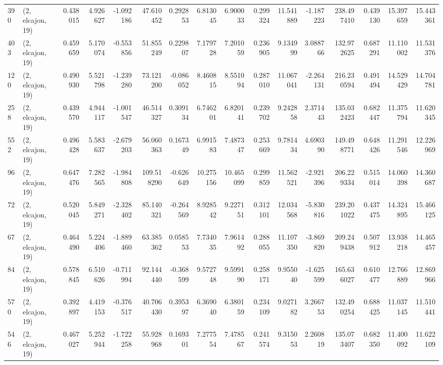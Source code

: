 \begin{tabular}{llrrrrrrrrrrrrrr}
390 &  (2, elcajon, 19) &   0.438015 &   4.926627 &  -1.092186 &    47.610452 &   0.292853 &   6.813045 &   6.900033 &  0.299324 &  11.541889 &  -1.187223 &   238.497410 &  0.439130 &  15.397659 &  15.443361 \\
403 &  (2, elcajon, 19) &   0.459659 &   5.170074 &  -0.553856 &    51.855249 &   0.229807 &   7.179728 &   7.201059 &  0.236905 &   9.134999 &   3.088766 &   132.972625 &  0.687291 &  11.110002 &  11.531376 \\
120 &  (2, elcajon, 19) &   0.490930 &   5.521798 &  -1.239280 &    73.121200 &  -0.086052 &   8.460815 &   8.551094 &  0.287010 &  11.067041 &  -2.264131 &   216.230594 &  0.491494 &  14.529429 &  14.704781 \\
258 &  (2, elcajon, 19) &   0.439570 &   4.944117 &  -1.001547 &    46.514327 &   0.309134 &   6.746201 &   6.820141 &  0.239702 &   9.242858 &   2.371443 &   135.032423 &  0.682447 &  11.375794 &  11.620345 \\
552 &  (2, elcajon, 19) &   0.496428 &   5.583637 &  -2.679203 &    56.060363 &   0.167349 &   6.991583 &   7.487347 &  0.253669 &   9.781434 &   4.690390 &   149.498771 &  0.648426 &  11.291546 &  12.226969 \\
96  &  (2, elcajon, 19) &   0.647476 &   7.282565 &  -1.984808 &   109.518290 &  -0.626649 &  10.275156 &  10.465099 &  0.299859 &  11.562521 &  -2.921396 &   206.229334 &  0.515014 &  14.060398 &  14.360687 \\
72  &  (2, elcajon, 19) &   0.520045 &   5.849271 &  -2.328402 &    85.140321 &  -0.264569 &   8.928542 &   9.227151 &  0.312101 &  12.034568 &  -5.830816 &   239.201022 &  0.437475 &  14.324895 &  15.466125 \\
67  &  (2, elcajon, 19) &   0.464490 &   5.224406 &  -1.889460 &    63.385362 &   0.058553 &   7.734035 &   7.961492 &  0.288055 &  11.107350 &  -3.869820 &   209.249438 &  0.507912 &  13.938218 &  14.465457 \\
84  &  (2, elcajon, 19) &   0.578845 &   6.510626 &  -0.711994 &    92.144440 &  -0.368599 &   9.572748 &   9.599190 &  0.258171 &   9.955040 &  -1.625599 &   165.636027 &  0.610477 &  12.766889 &  12.869966 \\
570 &  (2, elcajon, 19) &   0.392897 &   4.419153 &  -0.376517 &    40.706430 &   0.395397 &   6.369040 &   6.380159 &  0.234109 &   9.027182 &   3.266753 &   132.490254 &  0.688425 &  11.037145 &  11.510441 \\
546 &  (2, elcajon, 19) &   0.467027 &   5.252944 &  -1.722258 &    55.928968 &   0.169301 &   7.277554 &   7.478567 &  0.241574 &   9.315053 &   2.260819 &   135.073407 &  0.682350 &  11.400092 &  11.622109 \\

\end{tabular}
